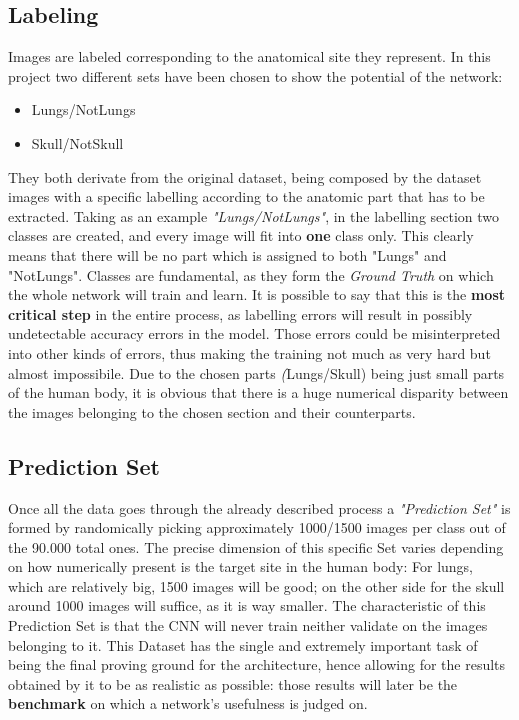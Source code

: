 \documentclass[../main.tex]{subfiles}
\begin{document}
\subsection{Labeling}
Images are labeled corresponding to the anatomical site they represent. In this project two different sets have been chosen to show the potential of the network:
\begin{itemize}
	\item Lungs/NotLungs
	\item Skull/NotSkull
\end{itemize}

They both derivate from the original dataset, being composed by the dataset images with a specific labelling according to the anatomic part that has to be extracted. Taking as an example \textit{"Lungs/NotLungs"}, in the labelling section two classes are created, and every image will fit into \textbf{one} class only. This clearly means that there will be no part which is assigned to both "Lungs" and "NotLungs". Classes are fundamental, as they form the \textit{Ground Truth} on which the whole network will train and learn. It is possible to say that this is the \textbf{most critical step} in the entire process, as labelling errors will result in possibly undetectable accuracy errors in the model. Those errors could be misinterpreted into other kinds of errors, thus making the training not much as very hard but almost impossibile.
Due to the chosen parts \textit(Lungs/Skull) being just small parts of the human body, it is obvious that there is a huge numerical disparity between the images belonging to the chosen section and their counterparts.
\vspace{5mm}
\subsection{Prediction Set}
Once all the data goes through the already described process a \textit{"Prediction Set"} is formed by randomically picking approximately 1000/1500 images per class out of the 90.000 total ones. The precise dimension of this specific Set varies depending on how numerically present is the target site in the human body: For lungs, which are relatively big, 1500 images will be good; on the other side for the skull around 1000 images will suffice, as it is way smaller. The characteristic of this Prediction Set is that the CNN will never train neither validate on the images belonging to it. This Dataset has the single and extremely important task of being the final proving ground for the architecture, hence allowing for the results obtained by it to be as realistic as possible: those results will later be the \textbf{benchmark} on which a network's usefulness is judged on.\cite{Karpathy2018}
\end{document}
